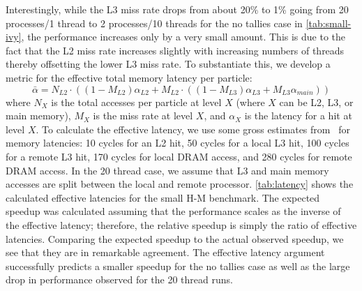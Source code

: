 \documentclass{mc2015}
\begin{document}
Interestingly, while the L3 miss rate drops from about 20\% to 1\% going from
20 processes/1 thread to 2 processes/10 threads for the no tallies case in
\autoref{tab:small-ivy}, the performance increases only by a very small
amount. This is due to the fact that the L2 miss rate increases slightly with
increasing numbers of threads thereby offsetting the lower L3 miss rate. To
substantiate this, we  develop a metric for the effective total memory
latency per particle:
\begin{equation}
  \bar{\alpha} = N_{L2}\cdot \left ( (1-M_{L2})\alpha_{L2} + M_{L2}\cdot((1 -
  M_{L3})\alpha_{L3} + M_{L3}\alpha_{main}) \right )
\end{equation}
where $N_X$ is the total accesses per particle at level $X$ (where $X$ can
be L2, L3, or main memory), $M_X$ is the miss rate at level $X$, and
$\alpha_X$ is the latency for a hit at level $X$. To calculate the
effective latency, we use some gross estimates from~\cite{intel} for memory
latencies: 10 cycles for an L2 hit, 50 cycles for a local L3 hit, 100 cycles for
a remote L3 hit, 170 cycles for local DRAM access, and 280 cycles for remote
DRAM access. In the 20 thread case, we assume that L3 and main memory accesses
are split between the local and remote processor. \autoref{tab:latency} shows
the calculated effective latencies for the small H-M benchmark. The expected
speedup was calculated assuming that the performance scales as the inverse of
the effective latency; therefore, the relative speedup is simply the ratio of
effective latencies. Comparing the expected speedup to the actual observed
speedup, we see that they are in remarkable agreement. The effective latency
argument successfully predicts a smaller speedup for the no tallies case as
well as the large drop in performance observed for the 20 thread runs.
\end{document}

